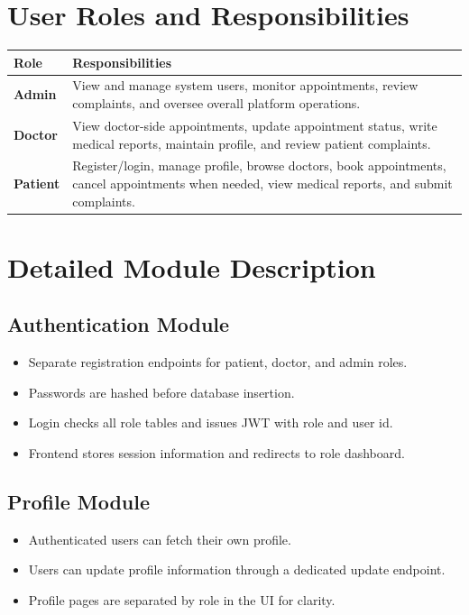 \documentclass[12pt,a4paper]{article}
\begin{document}
\section{User Roles and Responsibilities}
\begin{tabularx}{\linewidth}{>{\bfseries}p{2.5cm} X}
\toprule
Role & Responsibilities \\
\midrule
Admin & View and manage system users, monitor appointments, review complaints, and oversee overall platform operations. \\
Doctor & View doctor-side appointments, update appointment status, write medical reports, maintain profile, and review patient complaints. \\
Patient & Register/login, manage profile, browse doctors, book appointments, cancel appointments when needed, view medical reports, and submit complaints. \\
\bottomrule
\end{tabularx}

\section{Detailed Module Description}
\subsection{Authentication Module}
\begin{itemize}[leftmargin=1.2cm]
    \item Separate registration endpoints for patient, doctor, and admin roles.
    \item Passwords are hashed before database insertion.
    \item Login checks all role tables and issues JWT with role and user id.
    \item Frontend stores session information and redirects to role dashboard.
\end{itemize}

\subsection{Profile Module}
\begin{itemize}[leftmargin=1.2cm]
    \item Authenticated users can fetch their own profile.
    \item Users can update profile information through a dedicated update endpoint.
    \item Profile pages are separated by role in the UI for clarity.
\end{itemize}
\end{document}
